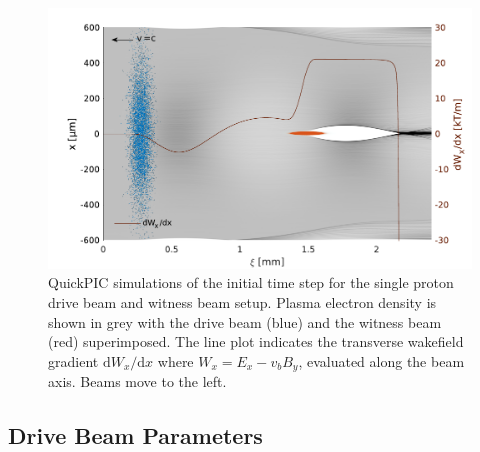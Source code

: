 \documentclass[aps,prstab,reprint,amsmath,amssymb,groupedaddress]{revtex4-1}
\begin{document}
\begin{figure}[hbt]
    \includegraphics[width=\linewidth,trim={2mm 0mm 2mm 0mm},clip]{figures/plasmaDenTWake}
    \caption{\label{Fig:PlasmaDenTWake} QuickPIC simulations of the initial time step for the single proton drive beam
        and witness beam setup. Plasma electron density is shown in grey with the drive beam (blue) and the witness beam
        (red) superimposed. The line plot indicates the transverse wakefield gradient $\textrm{d}W_{x}/\textrm{d}x$
        where $W_{x} = E_{x} - v_{b} B_{y}$, evaluated along the beam axis. Beams move to the left.}
\end{figure}

\subsection{Drive Beam Parameters}\label{S:M:Setup}

\end{document}
